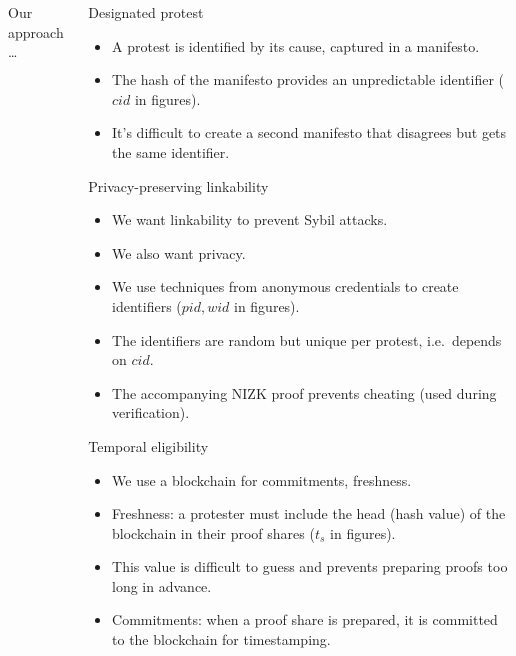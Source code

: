 \begin{columns}[t]
\begin{column}{0.32\linewidth}
    \begin{greenblock}{Our approach}
      \dots
    \end{greenblock}

  \end{column}

  \hfill

  \begin{column}{0.32\linewidth}

    \begin{blackblock}{Designated protest}
      \begin{itemize}
        \item A protest is identified by its cause, captured in a 
          manifesto.
        \item The hash of the manifesto provides an unpredictable identifier 
          (\(cid\) in figures).
        \item It's difficult to create a second manifesto that disagrees but 
          gets the same identifier.
      \end{itemize}
    \end{blackblock}

    \begin{blackblock}{Privacy-preserving linkability}
      \begin{itemize}
        \item We want linkability to prevent Sybil attacks.
        \item We also want privacy.
        \item We use techniques from anonymous credentials to create identifiers 
          (\(pid, wid\) in figures).
        \item The identifiers are random but unique per protest, i.e.\ depends 
          on \(cid\).
        \item The accompanying \ac{NIZK} proof prevents cheating (used during 
          verification).
      \end{itemize}
    \end{blackblock}

    \begin{blackblock}{Temporal eligibility}
      \begin{itemize}
        \item We use a blockchain for commitments, freshness.
        \item Freshness: a protester must include the head (hash value) of the 
          blockchain in their proof shares (\(t_s\) in figures).
        \item This value is difficult to guess and prevents preparing proofs too 
          long in advance.
        \item Commitments: when a proof share is prepared, it is committed to 
          the blockchain for timestamping.
      \end{itemize}
    \end{blackblock}


\end{column}
\end{columns}
